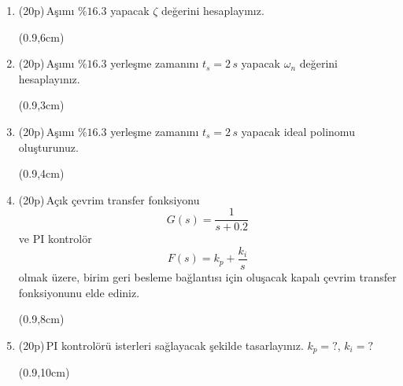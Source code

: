\begin{enumerate}[\bfseries S1.]
    \item (20p)\,Aşımı $\%16.3$ yapacak $\zeta$ değerini hesaplayınız.
    \noindent
    \begin{center}
        \framebox(0.9\textwidth,6cm){}
    \end{center}
    \item (20p)\,Aşımı $\%16.3$ yerleşme zamanını $t_s=2\,s$ yapacak $\omega_n$ değerini hesaplayınız.
    \noindent
    \begin{center}
        \framebox(0.9\textwidth,3cm){}
    \end{center}
    \item (20p)\,Aşımı $\%16.3$ yerleşme zamanını $t_s=2\,s$ yapacak ideal polinomu oluşturunuz.
        \noindent
    \begin{center}
        \framebox(0.9\textwidth,4cm){}
    \end{center}
    \item (20p)\,Açık çevrim transfer fonksiyonu
    \begin{equation}
        G(s)=\frac{1}{s+0.2}
    \end{equation}
    ve PI kontrolör 
    \begin{equation}
        F(s)=k_p+\frac{k_i}{s}
    \end{equation}
    olmak üzere, birim geri besleme bağlantısı için oluşacak kapalı çevrim transfer fonksiyonunu elde ediniz.
        \noindent
    \begin{center}
        \framebox(0.9\textwidth,8cm){}
    \end{center}
    \item (20p)\,PI kontrolörü isterleri sağlayacak şekilde tasarlayınız. $k_p=?$, $k_i=?$ 
        \noindent
    \begin{center}
        \framebox(0.9\textwidth,10cm){}
    \end{center}

\end{enumerate}

